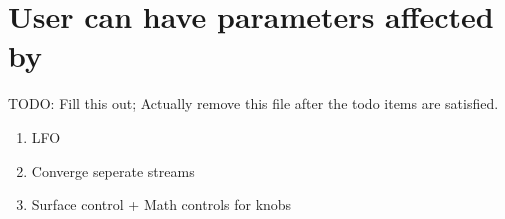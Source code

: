 \section{User can have parameters affected by}
TODO: Fill this out; Actually remove this file after the todo items are satisfied. 

\begin{enumerate}
	\item LFO

	\item Converge seperate streams


	\item Surface control + Math controls for knobs
\end{enumerate}
